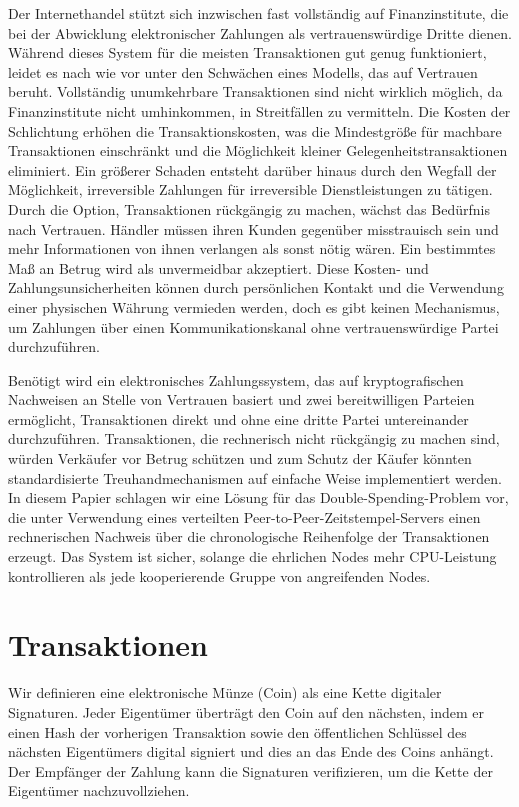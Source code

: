 \documentclass[9pt]{article}
\begin{document}
	Der Internethandel stützt sich inzwischen fast vollständig auf Finanzinstitute, die bei der Abwicklung elektronischer Zahlungen als vertrauenswürdige Dritte dienen. Während dieses System für die meisten Transaktionen gut genug funktioniert, leidet es nach wie vor unter den Schwächen eines Modells, das auf Vertrauen beruht. Vollständig unumkehrbare Transaktionen sind nicht wirklich möglich, da Finanzinstitute nicht umhinkommen, in Streitfällen zu vermitteln. Die Kosten der Schlichtung erhöhen die Transaktionskosten, was die Mindestgröße für machbare Transaktionen einschränkt und die Möglichkeit kleiner Gelegenheitstransaktionen eliminiert. Ein größerer Schaden entsteht darüber hinaus durch den Wegfall der Möglichkeit, irreversible Zahlungen für irreversible Dienstleistungen zu tätigen. Durch die Option, Transaktionen rückgängig zu machen, wächst das Bedürfnis nach Vertrauen. Händler müssen ihren Kunden gegenüber misstrauisch sein und mehr Informationen von ihnen verlangen als sonst nötig wären. Ein bestimmtes Maß an Betrug wird als unvermeidbar akzeptiert. Diese Kosten- und Zahlungsunsicherheiten können durch persönlichen Kontakt und die Verwendung einer physischen Währung vermieden werden, doch es gibt keinen Mechanismus, um Zahlungen über einen Kommunikationskanal ohne vertrauenswürdige Partei durchzuführen. 

	Benötigt wird ein elektronisches Zahlungssystem, das auf kryptografischen Nachweisen an Stelle von Vertrauen basiert und zwei bereitwilligen Parteien ermöglicht, Transaktionen direkt und ohne eine dritte Partei untereinander durchzuführen. Transaktionen, die rechnerisch nicht rückgängig zu machen sind, würden Verkäufer vor Betrug schützen und zum Schutz der Käufer könnten standardisierte Treuhandmechanismen auf einfache Weise implementiert werden. In diesem Papier schlagen wir eine Lösung für das Double-Spending-Problem vor, die unter Verwendung eines verteilten Peer-to-Peer-Zeitstempel-Servers einen rechnerischen Nachweis über die chronologische Reihenfolge der Transaktionen erzeugt. Das System ist sicher, solange die ehrlichen Nodes mehr CPU-Leistung kontrollieren als jede kooperierende Gruppe von angreifenden Nodes.
	
	\newpage
	
	\section{Transaktionen}
	Wir definieren eine elektronische Münze (Coin) als eine Kette digitaler Signaturen. Jeder Eigentümer überträgt den Coin auf den nächsten, indem er einen Hash der vorherigen Transaktion sowie den öffentlichen Schlüssel des nächsten Eigentümers digital signiert und dies an das Ende des Coins anhängt. Der Empfänger der Zahlung kann die Signaturen verifizieren, um die Kette der Eigentümer nachzuvollziehen.
	
\end{document}
